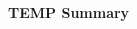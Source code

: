 \documentclass[10pt,a4paper,landscape]{article}
\begin{document}
\raggedright
\footnotesize

\begin{center}
     \huge{\textbf{TEMP Summary}} \\
\end{center}

\tableofcontents
\newpage

\begin{multicols*}{2}

\setlength{\columnseprule}{0.25pt}
\setlength{\premulticols}{1pt}
\setlength{\postmulticols}{1pt}
\setlength{\multicolsep}{1pt}
\setlength{\columnsep}{2pt}



\end{multicols*}
\end{document}
